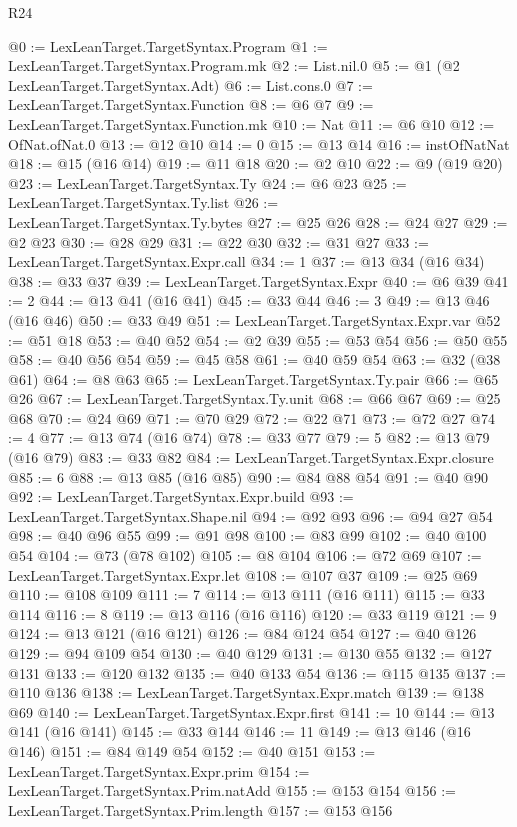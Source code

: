 \begin{lexlean}{R24}
\begin{coremodule}
@0 := LexLeanTarget.TargetSyntax.Program
@1 := LexLeanTarget.TargetSyntax.Program.mk
@2 := List.nil.{0}
@5 := @1 (@2 LexLeanTarget.TargetSyntax.Adt)
@6 := List.cons.{0}
@7 := LexLeanTarget.TargetSyntax.Function
@8 := @6 @7
@9 := LexLeanTarget.TargetSyntax.Function.mk
@10 := Nat
@11 := @6 @10
@12 := OfNat.ofNat.{0}
@13 := @12 @10
@14 := 0
@15 := @13 @14
@16 := instOfNatNat
@18 := @15 (@16 @14)
@19 := @11 @18
@20 := @2 @10
@22 := @9 (@19 @20)
@23 := LexLeanTarget.TargetSyntax.Ty
@24 := @6 @23
@25 := LexLeanTarget.TargetSyntax.Ty.list
@26 := LexLeanTarget.TargetSyntax.Ty.bytes
@27 := @25 @26
@28 := @24 @27
@29 := @2 @23
@30 := @28 @29
@31 := @22 @30
@32 := @31 @27
@33 := LexLeanTarget.TargetSyntax.Expr.call
@34 := 1
@37 := @13 @34 (@16 @34)
@38 := @33 @37
@39 := LexLeanTarget.TargetSyntax.Expr
@40 := @6 @39
@41 := 2
@44 := @13 @41 (@16 @41)
@45 := @33 @44
@46 := 3
@49 := @13 @46 (@16 @46)
@50 := @33 @49
@51 := LexLeanTarget.TargetSyntax.Expr.var
@52 := @51 @18
@53 := @40 @52
@54 := @2 @39
@55 := @53 @54
@56 := @50 @55
@58 := @40 @56 @54
@59 := @45 @58
@61 := @40 @59 @54
@63 := @32 (@38 @61)
@64 := @8 @63
@65 := LexLeanTarget.TargetSyntax.Ty.pair
@66 := @65 @26
@67 := LexLeanTarget.TargetSyntax.Ty.unit
@68 := @66 @67
@69 := @25 @68
@70 := @24 @69
@71 := @70 @29
@72 := @22 @71
@73 := @72 @27
@74 := 4
@77 := @13 @74 (@16 @74)
@78 := @33 @77
@79 := 5
@82 := @13 @79 (@16 @79)
@83 := @33 @82
@84 := LexLeanTarget.TargetSyntax.Expr.closure
@85 := 6
@88 := @13 @85 (@16 @85)
@90 := @84 @88 @54
@91 := @40 @90
@92 := LexLeanTarget.TargetSyntax.Expr.build
@93 := LexLeanTarget.TargetSyntax.Shape.nil
@94 := @92 @93
@96 := @94 @27 @54
@98 := @40 @96 @55
@99 := @91 @98
@100 := @83 @99
@102 := @40 @100 @54
@104 := @73 (@78 @102)
@105 := @8 @104
@106 := @72 @69
@107 := LexLeanTarget.TargetSyntax.Expr.let
@108 := @107 @37
@109 := @25 @69
@110 := @108 @109
@111 := 7
@114 := @13 @111 (@16 @111)
@115 := @33 @114
@116 := 8
@119 := @13 @116 (@16 @116)
@120 := @33 @119
@121 := 9
@124 := @13 @121 (@16 @121)
@126 := @84 @124 @54
@127 := @40 @126
@129 := @94 @109 @54
@130 := @40 @129
@131 := @130 @55
@132 := @127 @131
@133 := @120 @132
@135 := @40 @133 @54
@136 := @115 @135
@137 := @110 @136
@138 := LexLeanTarget.TargetSyntax.Expr.match
@139 := @138 @69
@140 := LexLeanTarget.TargetSyntax.Expr.first
@141 := 10
@144 := @13 @141 (@16 @141)
@145 := @33 @144
@146 := 11
@149 := @13 @146 (@16 @146)
@151 := @84 @149 @54
@152 := @40 @151
@153 := LexLeanTarget.TargetSyntax.Expr.prim
@154 := LexLeanTarget.TargetSyntax.Prim.natAdd
@155 := @153 @154
@156 := LexLeanTarget.TargetSyntax.Prim.length
@157 := @153 @156

\end{coremodule}
\end{lexlean}
